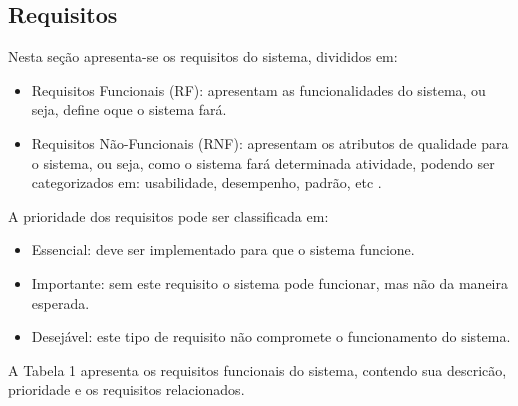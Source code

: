 \subsection{Requisitos}

Nesta se\c{c}\~ao apresenta-se os requisitos do sistema, divididos em:
\begin{itemize}
	
	\item  Requisitos Funcionais (RF): apresentam as funcionalidades do sistema, ou seja, define oque o sistema far\'a. 
	
	\item Requisitos N\~ao-Funcionais (RNF): apresentam os atributos de qualidade para o sistema, ou seja, como o sistema far\'a determinada atividade, podendo ser categorizados em: usabilidade, desempenho, padr\~ao, etc \cite{Ventura2016}. 
	
\end{itemize}

A prioridade dos requisitos pode ser classificada em: 

\begin{itemize}
	
	\item Essencial: deve ser implementado para que o sistema funcione. 

	\item Importante: sem este requisito o sistema pode funcionar, mas n\~ao da maneira esperada.
	
	\item Desej\'avel: este tipo de requisito n\~ao compromete o funcionamento do sistema.
	
\end{itemize}

A Tabela 1 apresenta os requisitos funcionais do sistema, contendo sua descric\~ao, prioridade e os requisitos relacionados. 

